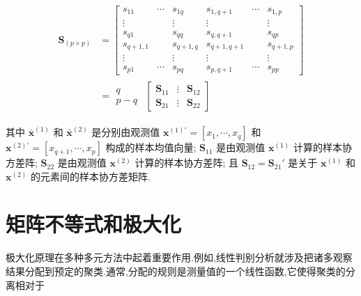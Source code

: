 \label{eq:2-47}
\begin{equation}
\begin{aligned}
\bm{S}_{(p \times p)} &=
\begin{bmatrix}
s_{11} & \cdots & s_{1q} & s_{1,q+1} & \cdots & s_{1,p} \\
\vdots & & \vdots & \vdots & & \vdots \\
s_{q1} & & s_{qq} & s_{q,q+1} & & s_{qp} \\ \hline
s_{q+1,1} & & s_{q+1,q} & s_{q+1,q+1} & & s_{q+1,p} \\
\vdots & & \vdots & \vdots & & \vdots \\
s_{p1} & \cdots & s_{pq} & s_{p,q+1} & \cdots & s_{pp}
\end{bmatrix} \\[4pt]
&= \begin{array}{c} q \\ p - q \end{array}
\begin{array}{c} \begin{bmatrix} \bm{S}_{11} & \vdots & \bm{S}_{12} \\ \hline \bm{S}_{21} & \vdots & \bm{S}_{22} \end{bmatrix} \end{array}
\end{aligned} \tag{2-47}
\end{equation}

其中 $\bar{\bm{x}}^{(1)}$ 和 $\bar{\bm{x}}^{(2)}$ 是分别由观测值 $\bm{x}^{(1)'} = [x_1, \cdots, x_q]$ 和 $\bm{x}^{(2)'} = [x_{q+1}, \cdots, x_p]$ 构成的样本均值向量; $\bm{S}_{11}$ 是由观测值 $\bm{x}^{(1)}$ 计算的样本协方差阵; $\bm{S}_{22}$ 是由观测值 $\bm{x}^{(2)}$ 计算的样本协方差阵; 且 $\bm{S}_{12} = \bm{S}_{21}'$ 是关于 $\bm{x}^{(1)}$ 和 $\bm{x}^{(2)}$ 的元素间的样本协方差矩阵.

\section{矩阵不等式和极大化}  %
\label{sec:2.7}

极大化原理在多种多元方法中起着重要作用.例如,线性判别分析就涉及把诸多观察结果分配到预定的聚类.通常,分配的规则是测量值的一个线性函数,它使得聚类的分离相对于
